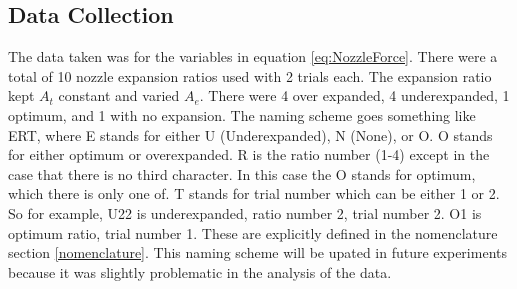 \subsection{Data Collection}
The data taken was for the variables in equation \ref{eq:NozzleForce}. There were a total of 10 nozzle expansion ratios used with 2 trials each. The expansion ratio kept $A_t$ constant and varied $A_e$. There were 4 over expanded, 4 underexpanded, 1 optimum, and 1 with no expansion. The naming scheme goes something like ERT, where E stands for either U (Underexpanded), N (None), or O. O stands for either optimum or overexpanded. R is the ratio number (1-4) except in the case that there is no third character. In this case the O stands for optimum, which there is only one of. T stands for trial number which can be either 1 or 2. So for example, U22 is underexpanded, ratio number 2, trial number 2. O1 is optimum ratio, trial number 1. These are explicitly defined in the nomenclature section \ref{nomenclature}.%
%
%
%
%
%
%
%
%
%
%
%
%
%
%
%
%
%
%
%
This naming scheme will be upated in future experiments because it was slightly problematic in the analysis of the data.
